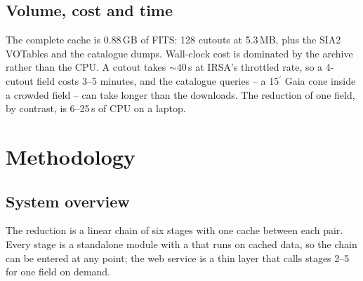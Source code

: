 \documentclass[11pt,a4paper]{article}
\newcommand{\arcmin}{\ensuremath{{}^{\prime}}}
\newcommand{\code}[1]{\texttt{\small\detokenize{#1}}}
\begin{document}
\subsection{Volume, cost and time}

The complete cache is 0.88\,GB of FITS: 128 cutouts at 5.3\,MB, plus the SIA2 VOTables and the
catalogue dumps. Wall-clock cost is dominated by the archive rather than the CPU. A cutout takes
$\sim$40\,s at IRSA's throttled rate, so a 4-cutout field costs 3--5 minutes, and the catalogue
queries -- a 15\arcmin{} Gaia cone inside a crowded field -- can take longer than the downloads. The
reduction of one field, by contrast, is 6--25\,s of CPU on a laptop.

\section{Methodology}
\label{sec:method}

\subsection{System overview}

The reduction is a linear chain of six stages with one cache between each pair. Every stage is a
standalone module with a \code{__main__} that runs on cached data, so the chain can be entered at
any point; the web service is a thin layer that calls stages 2--5 for one field on demand.
\end{document}
